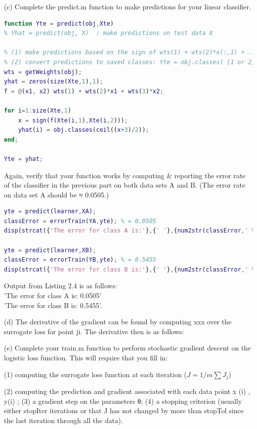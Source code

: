 \documentclass[]{report}   %
\begin{document}
{(c) Complete the predict.m function to make predictions for your linear classifier.}
\begin{lstlisting}[language=Matlab, caption=predict() Implementation]
function Yte = predict(obj,Xte)
% Yhat = predict(obj, X)  : make predictions on test data X

% (1) make predictions based on the sign of wts(1) + wts(2)*x(:,1) + ...
% (2) convert predictions to saved classes: Yte = obj.classes( [1 or 2] );
wts = getWeights(obj);
yhat = zeros(size(Xte,1),1);
f = @(x1, x2) wts(1) + wts(2)*x1 + wts(3)*x2;

for i=1:size(Xte,1)
    x = sign(f(Xte(i,1),Xte(i,2)));
    yhat(i) = obj.classes(ceil((x+3)/2));
end;

Yte = yhat;
\end{lstlisting}
{Again, verify that your function works by computing \& reporting the error rate of the classifier in the previous part on both data sets A and B. (The error rate on data set A should be ≈ 0.0505.)}
\begin{lstlisting}[language=Matlab, caption=Verifying predict() works]
yte = predict(learner,XA);
classError = errorTrain(YA,yte); % = 0.0505
disp(strcat({'The error for class A is:'},{' '},{num2str(classError,' %.4f')}));

yte = predict(learner,XB);
classError = errorTrain(YB,yte); % = 0.5455
disp(strcat({'The error for class B is:'},{' '},{num2str(classError,' %.4f')}));
\end{lstlisting}
\begin{center}
	{Output from Listing 2.4 is as follows: \\ 'The error for class A is: 0.0505' \\ 'The error for class B is: 0.5455'.}
\end{center} 
{(d) The derivative of the gradient can be found by computing xxx over the surrogate loss for point ji. The derivative then is as follows:
}



(e) Complete your train.m function to perform stochastic gradient descent on the logistic loss function. This will require that you fill in:

(1) computing the surrogate loss function at each iteration ($J = 1/m\sum J_{j}$)



(2) computing the prediction and gradient associated with each data point x
(i)
, y(i)
;
(3) a gradient step on the parameters θ;
(4) a stopping criterion (usually either stopIter iterations or that J has not changed by more
than stopTol since the last iteration through all the data).
\end{document}
